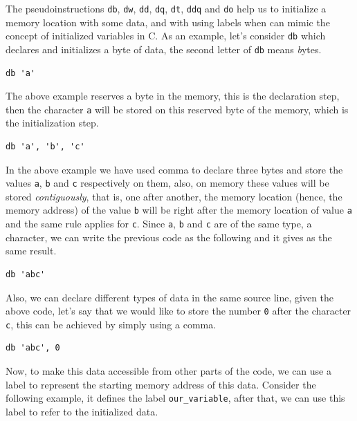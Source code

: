 The pseudoinstructions \lstinline!db!, \lstinline!dw!, \lstinline!dd!,
\lstinline!dq!, \lstinline!dt!, \lstinline!ddq! and \lstinline!do! help
us to initialize a memory location with some data, and with using labels
when can mimic the concept of initialized variables in C. As an example,
let's consider \lstinline!db! which declares and initializes a byte of
data, the second letter of \lstinline!db! means \emph{b}ytes.

\begin{lstlisting}
db 'a'
\end{lstlisting}

The above example reserves a byte in the memory, this is the declaration
step, then the character \lstinline!a! will be stored on this reserved
byte of the memory, which is the initialization step.

\begin{lstlisting}
db 'a', 'b', 'c'
\end{lstlisting}

In the above example we have used comma to declare three bytes and store
the values \lstinline!a!, \lstinline!b! and \lstinline!c! respectively
on them, also, on memory these values will be stored
\emph{contiguously}, that is, one after another, the memory location
(hence, the memory address) of the value \lstinline!b! will be right
after the memory location of value \lstinline!a! and the same rule
applies for \lstinline!c!. Since \lstinline!a!, \lstinline!b! and
\lstinline!c! are of the same type, a character, we can write the
previous code as the following and it gives as the same result.

\begin{lstlisting}
db 'abc'
\end{lstlisting}

Also, we can declare different types of data in the same source line,
given the above code, let's say that we would like to store the number
\lstinline!0! after the character \lstinline!c!, this can be achieved by
simply using a comma.

\begin{lstlisting}
db 'abc', 0
\end{lstlisting}

Now, to make this data accessible from other parts of the code, we can
use a label to represent the starting memory address of this data.
Consider the following example, it defines the label
\lstinline!our_variable!, after that, we can use this label to refer to
the initialized data.

